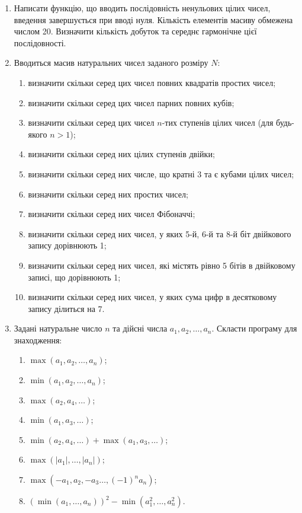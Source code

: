 \documentclass[a5paper,titlepage,openany,twoside,
]
{book_unv}%
\makeatletter
\newcommand{\xslalph}[1]{\expandafter\@xslalph\csname c@#1\endcsname}
\newcommand{\@xslalph}[1]{%
    \ifcase#1\or а\or б\or в\or г\or д\or e\or є\or ж\or з\or i%
    \or й\or к\or л\or м\or н\or о\or п\or р\or с\or т%
    \or у\or ф\or х\or ц\or ч\or ш\or ю\or я\or аа\or бб\or вв%
    \else\@ctrerr\fi%
}
\makeatother
\begin{document}
\begin{enumerate}
\def\labelenumi{\arabic{enumi})}
\setcounter{enumi}{6}
\item
  Написати функцію, що вводить послідовність ненульових цілих чисел,
  введення завершується при вводі нуля. Кількість елементів масиву
  обмежена числом 20. Визначити кількість добуток та середнє гармонічне
  цієї послідовності.
\item
  Вводиться масив натуральних чисел заданого розміру $N$:
\begin{enumerate}[label=\xslalph*)]
\item визначити скільки серед цих чисел повних квадратів простих чисел;
\item визначити скільки серед цих чисел парних повних кубів;
\item визначити скільки серед цих чисел $n$-тих ступенів цілих чисел (для
будь-якого $n>1$);
\item визначити скільки серед них цілих ступенів двійки;
\item визначити скільки серед них числе, що кратні 3 та є кубами цілих чисел;
\item визначити скільки серед них простих чисел;
\item визначити скільки серед них чисел Фібоначчі;
\item визначити скільки серед них чисел, у яких 5-й, 6-й та 8-й біт
двійкового запису дорівнюють 1;
\item визначити скільки серед них чисел, які містять рівно 5 бітів в
двійковому записі, що дорівнюють 1;
\item визначити скільки серед них чисел, у яких сума цифр в десятковому
запису ділиться на 7.
 \end{enumerate}

\item Задані натуральне число \(n\) та дійсні числа
\(a_{1},a_{2},\ldots,a_{n}\). Скласти програму для знаходження:
  \begin{multicols}{2}
\begin{enumerate}[label=\xslalph*)]
\item
 \(\max\left( a_{1},a_{2},\ldots,a_{n} \right)\); 
\item
\(\min\left( a_{1},a_{2},\ldots,a_{n} \right)\);
\item \(\max\left( a_{2},a_{4},\ldots \right)\); 
\item
\(\min\left( a_{1},a_{3},\ldots \right)\);
\item
\(\min\left( a_{2},a_{4},\ldots \right) + \max\left( a_{1},a_{3},\ldots \right)\);
\item
\(\max\left( \left| a_{1} \right|,\ldots,\left| a_{n} \right| \right)\);
\item \(\max\left( -a_{1},a_{2}, -a_{3}\ldots,(-1)^{n}a_{n} \right)\);
\item
\(\left( \min\left( a_{1},\ldots,a_{n} \right) \right)^{2} - \min\left( a_{1}^{2},\ldots,a_{n}^{2} \right)\).


\end{enumerate}
\end{multicols}
\end{enumerate}
\end{document}
